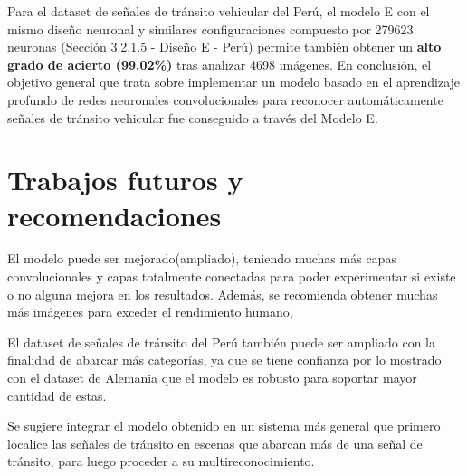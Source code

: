 	Para el dataset de señales de tránsito vehicular del Perú, el modelo E con el mismo diseño neuronal y similares configuraciones compuesto por 279623 neuronas (Sección 3.2.1.5 - Diseño E - Perú) permite también obtener un {\bf alto grado de acierto (99.02\%)} tras analizar 4698 imágenes. 
\vskip 0.2cm
	En conclusión, el objetivo general que trata sobre implementar un modelo basado en el aprendizaje profundo de redes neuronales convolucionales para reconocer automáticamente señales de tránsito vehicular fue conseguido a través del Modelo E.	 


\section{Trabajos futuros y recomendaciones}


	El modelo puede ser mejorado(ampliado), teniendo muchas más capas convolucionales y capas totalmente conectadas para poder experimentar si existe o no alguna mejora en los resultados. Además, se recomienda obtener muchas más imágenes para exceder el rendimiento humano, \citep{Goodfellow-et-al-2016}

	El dataset de señales de tránsito del Perú también puede ser ampliado con la finalidad de abarcar más categorías, ya que se tiene confianza por lo mostrado con el dataset de Alemania que el modelo es robusto para soportar mayor cantidad de estas.
	
	Se sugiere integrar el modelo obtenido en un sistema más general que primero localice las señales de tránsito en escenas que abarcan más de una señal de tránsito, para luego proceder a su multireconocimiento.

\newpage